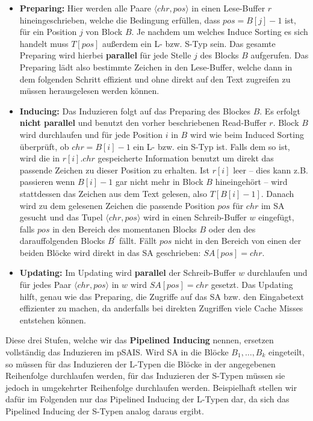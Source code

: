 \begin{itemize}
\item \textbf{Preparing:} Hier werden alle Paare $\langle chr, pos \rangle$ in einen Lese-Buffer $r$ hineingeschrieben, welche die Bedingung erfüllen, dass $pos = B[j]-1$ ist, für ein Position $j$ von Block $B$. Je nachdem um welches Induce Sorting es sich handelt muss $T[pos]$ außerdem ein L- bzw. S-Typ sein. Das gesamte Preparing wird hierbei \textbf{parallel} für jede Stelle $j$ des Blocks $B$ aufgerufen. Das Preparing lädt also bestimmte Zeichen in den Lese-Buffer, welche dann in dem folgenden Schritt effizient und ohne direkt auf den Text zugreifen zu müssen herausgelesen werden können.

\item \textbf{Inducing:} Das Induzieren folgt auf das Preparing des Blockes $B$. Es erfolgt \textbf{nicht parallel} und benutzt den vorher beschriebenen Read-Buffer $r$. Block $B$ wird durchlaufen und für jede Position $i$ in $B$ wird wie beim Induced Sorting überprüft, ob $chr = B[i]-1$ ein L- bzw. ein S-Typ ist. Falls dem so ist, wird die in $r[i].chr$ gespeicherte Information benutzt um direkt das passende Zeichen zu dieser Position zu erhalten. Ist $r[i]$ leer -- dies kann z.B. passieren wenn $B[i]-1$ gar nicht mehr in Block $B$ hineingehört -- wird stattdessen das Zeichen aus dem Text gelesen, also $T[B[i]-1]$. Danach wird zu dem gelesenen Zeichen die passende Position $pos$ für $chr$ im SA gesucht und das Tupel $\langle chr, pos \rangle$ wird in einen Schreib-Buffer $w$ eingefügt, falls $pos$ in den Bereich des momentanen Blocks $B$ oder den des darauffolgenden Blocks $B^\prime$ fällt. Fällt $pos$ nicht in den Bereich von einen der beiden Blöcke wird direkt in das SA geschrieben: $SA[pos] = chr$.

\item \textbf{Updating:} Im Updating wird \textbf{parallel} der Schreib-Buffer $w$ durchlaufen und für jedes Paar $\langle chr, pos \rangle$ in $w$ wird $SA[pos] = chr$ gesetzt. Das Updating hilft, genau wie das Preparing, die Zugriffe auf das SA bzw. den Eingabetext effizienter zu machen, da anderfalls bei direkten Zugriffen viele Cache Misses entstehen können.
\end{itemize}

Diese drei Stufen, welche wir das \textbf{Pipelined Inducing} nennen, ersetzen vollständig das Induzieren im pSAIS. Wird SA in die Blöcke $B_1, \ldots, B_k$ eingeteilt, so müssen für das Induzieren der L-Typen die Blöcke in der angegebenen Reihenfolge durchlaufen werden, für das Induzieren der S-Typen müssen sie jedoch in umgekehrter Reihenfolge durchlaufen werden. Beispielhaft stellen wir dafür im Folgenden nur das Pipelined Inducing der L-Typen dar, da sich das Pipelined Inducing der S-Typen analog daraus ergibt.

